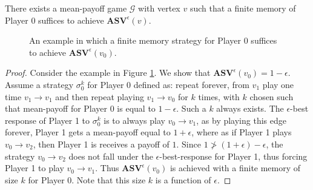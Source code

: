 \begin{theorem}
\label{ThmExNeedFinMem}
There exists a mean-payoff game $\mathcal{G}$ with vertex $v$ such that a finite memory of Player $0$ suffices to achieve $\mathbf{ASV}^{\epsilon}(v)$.
\end{theorem}
\begin{figure}
    \centering
    \caption{An example in which a finite memory strategy for Player $0$ suffices to achieve $\mathbf{ASV}^{\epsilon}(v_0)$.}
    \label{fig:finite_strategy_response}
\end{figure}
\begin{proof}
Consider the example in Figure \ref{fig:finite_strategy_response}. We show that $\mathbf{ASV}^{\epsilon}(v_0) = 1 - \epsilon$. Assume a strategy $\sigma_0^{k}$ for Player 0 defined as: repeat forever, from $v_1$ play one time $v_1 \to v_1$ and then repeat playing $v_1 \to v_0$ for $k$ times, with $k$ chosen such that mean-payoff for Player 0 is equal to $1 - \epsilon$. Such a $k$ always exists. The $\epsilon$-best response of Player 1 to $\sigma_0^{k}$ is to always play $v_0 \to v_1$, as by playing this edge forever, Player 1 gets a mean-payoff equal to $1+\epsilon$, where as if Player 1 plays $v_0 \to v_2$, then Player 1 is receives a payoff of $1$. Since $1 \ngtr (1 + \epsilon) - \epsilon$, the strategy $v_0 \to v_2$ does not fall under the $\epsilon$-best-response for Player 1, thus forcing Player 1 to play $v_0 \to v_1$. Thus $\mathbf{ASV}^{\epsilon}(v_0)$ is achieved with a finite memory of size $k$ for Player 0. Note that this size $k$ is a function of $\epsilon$.
\end{proof}